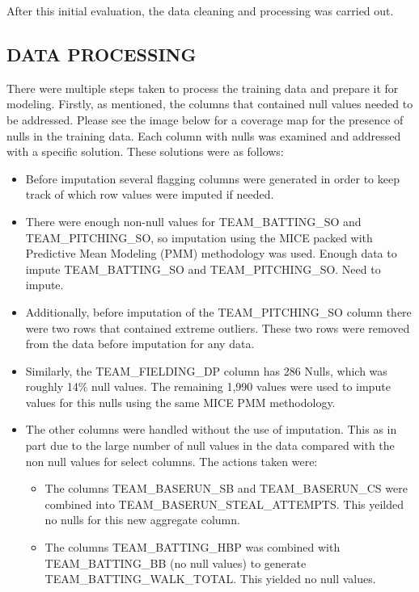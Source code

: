 \documentclass[
]{article}
\providecommand{\tightlist}{%
  \setlength{\itemsep}{0pt}\setlength{\parskip}{0pt}}
\begin{document}
After this initial evaluation, the data cleaning and processing was
carried out.

\subsection{DATA PROCESSING}\label{data-processing}

There were multiple steps taken to process the training data and prepare
it for modeling. Firstly, as mentioned, the columns that contained null
values needed to be addressed. Please see the image below for a coverage
map for the presence of nulls in the training data. Each column with
nulls was examined and addressed with a specific solution. These
solutions were as follows:

\begin{itemize}
\tightlist
\item
  Before imputation several flagging columns were generated in order to
  keep track of which row values were imputed if needed.
\item
  There were enough non-null values for TEAM\_BATTING\_SO and
  TEAM\_PITCHING\_SO, so imputation using the MICE packed with
  Predictive Mean Modeling (PMM) methodology was used. Enough data to
  impute TEAM\_BATTING\_SO and TEAM\_PITCHING\_SO. Need to impute.
\item
  Additionally, before imputation of the TEAM\_PITCHING\_SO column there
  were two rows that contained extreme outliers. These two rows were
  removed from the data before imputation for any data.
\item
  Similarly, the TEAM\_FIELDING\_DP column has 286 Nulls, which was
  roughly 14\% null values. The remaining 1,990 values were used to
  impute values for this nulls using the same MICE PMM methodology.
\item
  The other columns were handled without the use of imputation. This as
  in part due to the large number of null values in the data compared
  with the non null values for select columns. The actions taken were:

  \begin{itemize}
  \tightlist
  \item
    The columns TEAM\_BASERUN\_SB and TEAM\_BASERUN\_CS were combined
    into TEAM\_BASERUN\_STEAL\_ATTEMPTS. This yeilded no nulls for this
    new aggregate column.
  \item
    The columns TEAM\_BATTING\_HBP was combined with TEAM\_BATTING\_BB
    (no null values) to generate TEAM\_BATTING\_WALK\_TOTAL. This
    yielded no null values.
  \end{itemize}
\end{itemize}
\end{document}
